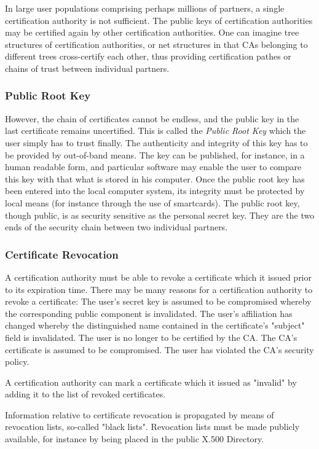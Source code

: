 In large user populations comprising perhaps millions of partners, a single certification 
authority is not sufficient. The public keys of certification authorities may be 
certified again by other certification authorities. One can imagine tree structures 
of certification authorities, or net structures in that CAs belonging to different trees
cross-certify each other, thus providing certification pathes or chains of trust 
between individual partners. 

\subsubsection{Public Root Key}
However, the chain of certificates cannot be endless, and the public key in the last 
certificate remains uncertified. This is called the {\em Public Root Key} which the 
user simply has
to trust finally. The authenticity and integrity of this key has to be provided by 
out-of-band means. The key can be published,  for instance, in a human readable form, 
and particular software may enable the user to compare this key with that what is stored
in his computer. Once the public root key has been entered into the local computer
system, its integrity must be protected by local means (for instance
through the use of smartcards). The public root key, though public, is as security
sensitive as the personal secret key. They are the two ends of the security
chain between two individual partners.

\subsubsection{Certificate Revocation}
A certification authority must be able to revoke a certificate which it issued
prior to its expiration time. There may be many reasons for a certification authority
to revoke a certificate:
\bi
\m The user's secret key is assumed to be compromised whereby the
corresponding public component is invalidated.
\m The user's affiliation has changed whereby the distinguished
name contained in the certificate's "subject" field is invalidated.
\m The user is no longer to be certified by the CA.
\m The CA's certificate is assumed to be compromised.
\m The user has violated the CA's security policy.
\ei

A certification authority can mark a certificate which it issued as "invalid" by adding
it to the list of revoked certificates.

Information relative to certificate revocation is propagated by
means of revocation lists, so-called "black lists".
Revocation lists must be made publicly available, for instance by being placed in
the public X.500 Directory.
